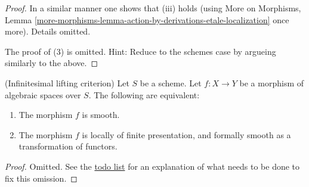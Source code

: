 \begin{proof}
\medskip\noindent
In a similar manner one shows that (iii) holds (using
More on Morphisms,
Lemma \ref{more-morphisms-lemma-action-by-derivations-etale-localization}
once more). Details omitted.

\medskip\noindent
The proof of (3) is omitted. Hint: Reduce to the schemes case by
argueing similarly to the above.
\end{proof}

\begin{lemma}
\label{lemma-smooth-formally-smooth}
(Infinitesimal lifting criterion)
Let $S$ be a scheme.
Let $f : X \to Y$ be a morphism of algebraic spaces over $S$.
The following are equivalent:
\begin{enumerate}
\item The morphism $f$ is smooth.
\item The morphism $f$ is locally of finite presentation, and
formally smooth as a transformation of functors.
\end{enumerate}
\end{lemma}

\begin{proof}
Omitted. See the
\href{http://math.columbia.edu/algebraic_geometry/%
stacks-git/documentation/todo-list}{todo list}
for an explanation of what needs to be done to fix this omission.
\end{proof}















